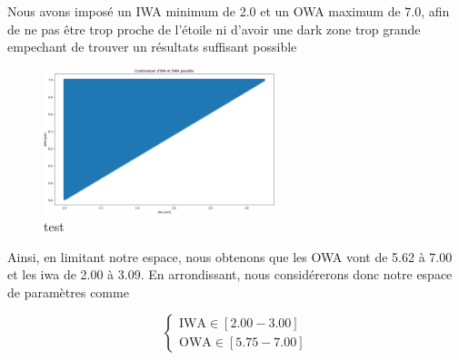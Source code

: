 Nous avons imposé un IWA minimum de 2.0 et un OWA maximum de 7.0, afin de ne pas être trop proche de l’étoile ni d’avoir une dark zone trop grande empechant de trouver un résultats suffisant possible 


\begin{figure}
    \centering
    \includegraphics[width=0.6\textwidth]{figures/comb_iwa_owa_hq.png}
    \caption{test}
\end{figure}

Ainsi, en limitant notre espace, nous obtenons que les OWA vont de 5.62 à 7.00 et les iwa de 2.00 à 3.09. 
En arrondissant, nous considérerons donc notre espace de paramètres comme

\[
\begin{cases}
\text{IWA} \in [2.00 - 3.00] \\
\text{OWA} \in [5.75 - 7.00]
\end{cases}\]





    
    
